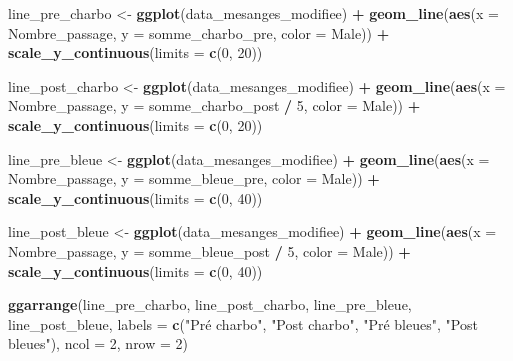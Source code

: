 \documentclass[
  french,
]{article}
\newenvironment{Shaded}{\begin{snugshade}}{\end{snugshade}}
\newcommand{\AttributeTok}[1]{\textcolor[rgb]{0.13,0.29,0.53}{#1}}
\newcommand{\DecValTok}[1]{\textcolor[rgb]{0.00,0.00,0.81}{#1}}
\newcommand{\FunctionTok}[1]{\textcolor[rgb]{0.13,0.29,0.53}{\textbf{#1}}}
\newcommand{\NormalTok}[1]{#1}
\newcommand{\OtherTok}[1]{\textcolor[rgb]{0.56,0.35,0.01}{#1}}
\newcommand{\SpecialCharTok}[1]{\textcolor[rgb]{0.81,0.36,0.00}{\textbf{#1}}}
\newcommand{\StringTok}[1]{\textcolor[rgb]{0.31,0.60,0.02}{#1}}
\begin{document}
\begin{Shaded}
\begin{Highlighting}[]
\NormalTok{line\_pre\_charbo }\OtherTok{\textless{}{-}} \FunctionTok{ggplot}\NormalTok{(data\_mesanges\_modifiee) }\SpecialCharTok{+}
  \FunctionTok{geom\_line}\NormalTok{(}\FunctionTok{aes}\NormalTok{(}\AttributeTok{x =}\NormalTok{ Nombre\_passage, }\AttributeTok{y =}\NormalTok{ somme\_charbo\_pre, }\AttributeTok{color =}\NormalTok{ Male)) }\SpecialCharTok{+}
  \FunctionTok{scale\_y\_continuous}\NormalTok{(}\AttributeTok{limits =} \FunctionTok{c}\NormalTok{(}\DecValTok{0}\NormalTok{, }\DecValTok{20}\NormalTok{))}

\NormalTok{line\_post\_charbo }\OtherTok{\textless{}{-}} \FunctionTok{ggplot}\NormalTok{(data\_mesanges\_modifiee) }\SpecialCharTok{+}
  \FunctionTok{geom\_line}\NormalTok{(}\FunctionTok{aes}\NormalTok{(}\AttributeTok{x =}\NormalTok{ Nombre\_passage, }\AttributeTok{y =}\NormalTok{ somme\_charbo\_post }\SpecialCharTok{/} \DecValTok{5}\NormalTok{, }\AttributeTok{color =}\NormalTok{ Male)) }\SpecialCharTok{+}
  \FunctionTok{scale\_y\_continuous}\NormalTok{(}\AttributeTok{limits =} \FunctionTok{c}\NormalTok{(}\DecValTok{0}\NormalTok{, }\DecValTok{20}\NormalTok{))}

\NormalTok{line\_pre\_bleue }\OtherTok{\textless{}{-}} \FunctionTok{ggplot}\NormalTok{(data\_mesanges\_modifiee) }\SpecialCharTok{+}
  \FunctionTok{geom\_line}\NormalTok{(}\FunctionTok{aes}\NormalTok{(}\AttributeTok{x =}\NormalTok{ Nombre\_passage, }\AttributeTok{y =}\NormalTok{ somme\_bleue\_pre, }\AttributeTok{color =}\NormalTok{ Male)) }\SpecialCharTok{+}
  \FunctionTok{scale\_y\_continuous}\NormalTok{(}\AttributeTok{limits =} \FunctionTok{c}\NormalTok{(}\DecValTok{0}\NormalTok{, }\DecValTok{40}\NormalTok{))}

\NormalTok{line\_post\_bleue }\OtherTok{\textless{}{-}} \FunctionTok{ggplot}\NormalTok{(data\_mesanges\_modifiee) }\SpecialCharTok{+}
  \FunctionTok{geom\_line}\NormalTok{(}\FunctionTok{aes}\NormalTok{(}\AttributeTok{x =}\NormalTok{ Nombre\_passage, }\AttributeTok{y =}\NormalTok{ somme\_bleue\_post }\SpecialCharTok{/} \DecValTok{5}\NormalTok{, }\AttributeTok{color =}\NormalTok{ Male)) }\SpecialCharTok{+}
  \FunctionTok{scale\_y\_continuous}\NormalTok{(}\AttributeTok{limits =} \FunctionTok{c}\NormalTok{(}\DecValTok{0}\NormalTok{, }\DecValTok{40}\NormalTok{))}

\FunctionTok{ggarrange}\NormalTok{(line\_pre\_charbo, line\_post\_charbo, line\_pre\_bleue, line\_post\_bleue,}
                         \AttributeTok{labels =} \FunctionTok{c}\NormalTok{(}\StringTok{"Pré charbo"}\NormalTok{, }\StringTok{"Post charbo"}\NormalTok{, }\StringTok{"Pré bleues"}\NormalTok{, }\StringTok{"Post bleues"}\NormalTok{),}
                         \AttributeTok{ncol =} \DecValTok{2}\NormalTok{, }\AttributeTok{nrow =} \DecValTok{2}\NormalTok{)}
\end{Highlighting}
\end{Shaded}
\end{document}
